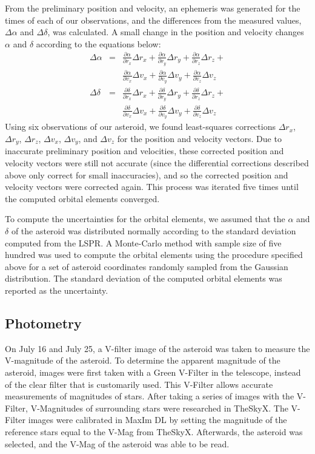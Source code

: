 \documentclass[11pt,a4paper]{article}
\begin{document}
From the preliminary position and velocity, an ephemeris was generated for the times of each of our observations, and the differences from the measured values, $\Delta \alpha$ and $\Delta \delta$, was calculated.
A small change in the position and velocity changes $\alpha$ and $\delta$ according to the equations below:
\begin{eqnarray*}
\Delta \alpha &=& \frac{\partial \alpha}{\partial r_x} \Delta r_x + \frac{\partial \alpha}{\partial r_y} \Delta r_y + \frac{\partial \alpha}{\partial r_z} \Delta r_z + \\& &
\frac{\partial \alpha}{\partial v_x} \Delta v_x + \frac{\partial \alpha}{\partial v_y} \Delta v_y + \frac{\partial \alpha}{\partial v_z} \Delta v_z   \\
\Delta \delta &=& \frac{\partial \delta}{\partial r_x} \Delta r_x + \frac{\partial \delta}{\partial r_y} \Delta r_y + \frac{\partial \delta}{\partial r_z} \Delta r_z + \\& &
\frac{\partial \delta}{\partial v_x} \Delta v_x + \frac{\partial \delta}{\partial v_y} \Delta v_y + \frac{\partial \delta}{\partial v_z} \Delta v_z
\end{eqnarray*}
Using six observations of our asteroid, we found least-squares corrections $\Delta r_x$, $\Delta r_y$, $\Delta r_z$, $\Delta v_x$, $\Delta v_y$, and $\Delta v_z$ for the position and velocity vectors.
Due to inaccurate preliminary position and velocities, these corrected position and velocity vectors were still not accurate (since the differential corrections described above only correct for small inaccuracies), and so the corrected position and velocity vectors were corrected again.
This process was iterated five times until the computed orbital elements converged.

To compute the uncertainties for the orbital elements, we assumed that the $\alpha$ and $\delta$ of the asteroid was distributed normally according to the standard deviation computed from the LSPR.
A Monte-Carlo method with sample size of five hundred was used to compute the orbital elements using the procedure specified above for a set of asteroid coordinates randomly sampled from the Gaussian distribution.
The standard deviation of the computed orbital elements was reported as the uncertainty.

\subsection{Photometry}
On July 16 and July 25, a V-filter image of the asteroid was taken to measure the V-magnitude of the asteroid.
To determine the apparent magnitude of the asteroid, images were first taken with a Green V-Filter in the telescope, instead of the clear filter that is customarily used.
This V-Filter allows accurate measurements of magnitudes of stars.
After taking a series of images with the V-Filter, V-Magnitudes of surrounding stars were researched in TheSkyX.
The V-Filter images were calibrated in MaxIm DL by setting the magnitude of the reference stars equal to the V-Mag from TheSkyX.
Afterwards, the asteroid was selected, and the V-Mag of the asteroid was able to be read. 
\end{document}
